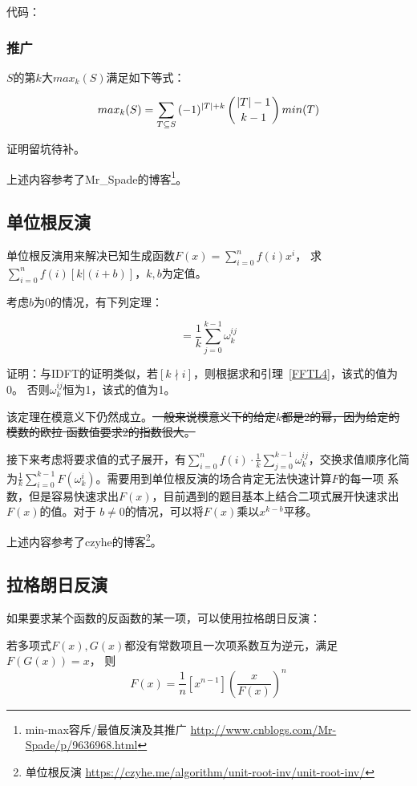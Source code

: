 代码：


\subsubsection{推广}
$S$的第$k$大$max_k(S)$满足如下等式：

\begin{displaymath}
	max_k(S)=\sum_{T\subseteq S}{(-1)^{|T|+k}\left(|T|-1 \atop k-1\right)min(T)}
\end{displaymath}

证明留坑待补。

上述内容参考了Mr\_Spade的博客\footnote{
	min-max容斥/最值反演及其推广
	\url{http://www.cnblogs.com/Mr-Spade/p/9636968.html}
}。
\subsection{单位根反演}
单位根反演用来解决已知生成函数$F(x)=\displaystyle \sum_{i=0}^n{f(i)x^i}$，
求$\displaystyle \sum_{i=0}^n{f(i)[k|(i+b)]}$，$k,b$为定值。

考虑$b$为0的情况，有下列定理：
\begin{theorem}
	\begin{displaymath}
		[k|i]=\frac{1}{k}\sum_{j=0}^{k-1}{\omega_k^{ij}}
	\end{displaymath}
\end{theorem}

证明：与IDFT的证明类似，若$[k\nmid i]$，则根据求和引理~\ref{FFTL4}，该式的值为0。
否则$\omega_k^{ij}$恒为1，该式的值为1。

该定理在模意义下仍然成立。\sout{一般来说模意义下的给定$k$都是2的幂，因为给定的模数的欧拉
函数值要求2的指数很大。}

接下来考虑将要求值的式子展开，有$\displaystyle \sum_{i=0}^n{f(i)\cdot \frac{1}{k}
\sum_{j=0}^{k-1}{\omega_k^{ij}}}$，交换求值顺序化简为$\frac{1}{k}\displaystyle
\sum_{i=0}^{k-1}{F(\omega_k^i)}$。需要用到单位根反演的场合肯定无法快速计算$F$的每一项
系数，但是容易快速求出$F(x)$，目前遇到的题目基本上结合二项式展开快速求出$F(x)$的值。对于
$b\neq 0$的情况，可以将$F(x)$乘以$x^{k-b}$平移。

上述内容参考了czyhe的博客\footnote{
	单位根反演
\url{https://czyhe.me/algorithm/unit-root-inv/unit-root-inv/}}。
\subsection{拉格朗日反演}
如果要求某个函数的反函数的某一项，可以使用拉格朗日反演：
\begin{theorem}
	若多项式$F(x),G(x)$都没有常数项且一次项系数互为逆元，满足$F(G(x))=x$，
	则\begin{displaymath}
		[x_n]F(x)=\frac{1}{n}[x^{n-1}](\frac{x}{F(x)})^n
	\end{displaymath}
\end{theorem}
